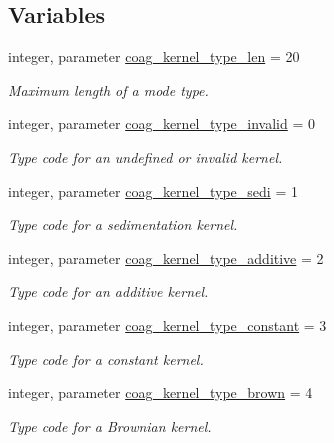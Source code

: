 \subsection*{Variables}
\begin{DoxyCompactItemize}
\item 
integer, parameter \mbox{\hyperlink{namespacepmc__coag__kernel_a5b9c2196146dafb206c5442d2c928559}{coag\+\_\+kernel\+\_\+type\+\_\+len}} = 20
\begin{DoxyCompactList}\small\item\em Maximum length of a mode type. \end{DoxyCompactList}\item 
integer, parameter \mbox{\hyperlink{namespacepmc__coag__kernel_a299db166a8c9252d1ee80b1bab04270b}{coag\+\_\+kernel\+\_\+type\+\_\+invalid}} = 0
\begin{DoxyCompactList}\small\item\em Type code for an undefined or invalid kernel. \end{DoxyCompactList}\item 
integer, parameter \mbox{\hyperlink{namespacepmc__coag__kernel_acc427a94f9c674be417fa4eb397cd808}{coag\+\_\+kernel\+\_\+type\+\_\+sedi}} = 1
\begin{DoxyCompactList}\small\item\em Type code for a sedimentation kernel. \end{DoxyCompactList}\item 
integer, parameter \mbox{\hyperlink{namespacepmc__coag__kernel_a75f7fd7b7f1f6d38bb03828c46e1be66}{coag\+\_\+kernel\+\_\+type\+\_\+additive}} = 2
\begin{DoxyCompactList}\small\item\em Type code for an additive kernel. \end{DoxyCompactList}\item 
integer, parameter \mbox{\hyperlink{namespacepmc__coag__kernel_a6706cc1fc48d83cd5fbca4bba57d60b2}{coag\+\_\+kernel\+\_\+type\+\_\+constant}} = 3
\begin{DoxyCompactList}\small\item\em Type code for a constant kernel. \end{DoxyCompactList}\item 
integer, parameter \mbox{\hyperlink{namespacepmc__coag__kernel_aa6a324c3d911cbc50a287ebb1b873535}{coag\+\_\+kernel\+\_\+type\+\_\+brown}} = 4
\begin{DoxyCompactList}\small\item\em Type code for a Brownian kernel. \end{DoxyCompactList}\item 

\end{DoxyCompactItemize}
